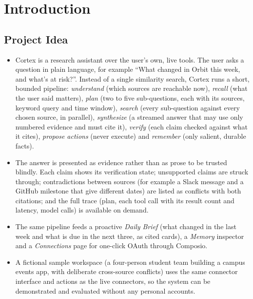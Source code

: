
\chapter{Introduction}
\label{ch:intro}
\section{Project Idea}
\begin{itemize}
\item Cortex is a research assistant over the user's own, live tools. The user asks a question in plain language, for example ``What changed in Orbit this week, and what's at risk?''. Instead of a single similarity search, Cortex runs a short, bounded pipeline: \emph{understand} (which sources are reachable now), \emph{recall} (what the user said matters), \emph{plan} (two to five sub-questions, each with its sources, keyword query and time window), \emph{search} (every sub-question against every chosen source, in parallel), \emph{synthesize} (a streamed answer that may use only numbered evidence and must cite it), \emph{verify} (each claim checked against what it cites), \emph{propose actions} (never execute) and \emph{remember} (only salient, durable facts).
\item The answer is presented as evidence rather than as prose to be trusted blindly. Each claim shows its verification state; unsupported claims are struck through; contradictions between sources (for example a Slack message and a GitHub milestone that give different dates) are listed as conflicts with both citations; and the full trace (plan, each tool call with its result count and latency, model calls) is available on demand.
\item The same pipeline feeds a proactive \emph{Daily Brief} (what changed in the last week and what is due in the next three, as cited cards), a \emph{Memory} inspector and a \emph{Connections} page for one-click OAuth through Composio.
\item A fictional sample workspace (a four-person student team building a campus events app, with deliberate cross-source conflicts) uses the same connector interface and actions as the live connectors, so the system can be demonstrated and evaluated without any personal accounts.
\end{itemize}


